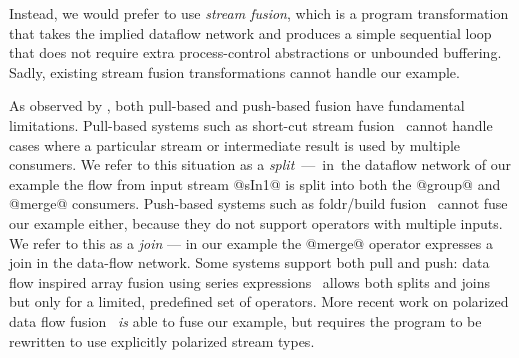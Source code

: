 
Instead, we would prefer to use \emph{stream fusion}, which is a program transformation that takes the implied dataflow network and produces a simple sequential loop that does not require extra process-control abstractions or unbounded buffering. Sadly, existing stream fusion transformations cannot handle our example. 

As observed by \citet{kay2009you}, both pull-based and push-based fusion have fundamental limitations. Pull-based systems such as short-cut stream fusion~\cite{coutts2007stream} cannot handle cases where a particular stream or intermediate result is used by multiple consumers. We refer to this situation as a \mbox{\emph{split} --- in the} dataflow network of our example the flow from input stream @sIn1@ is split into both the @group@ and @merge@ consumers. Push-based systems such as foldr/build fusion~\cite{gill1993short} cannot fuse our example either, because they do not support operators with multiple inputs. We refer to this as a \emph{join} --- in our example the @merge@ operator expresses a join in the data-flow network. Some systems support both pull and push: data flow inspired array fusion using series expressions~\cite{lippmeier2013data} allows both splits and joins but only for a limited, predefined set of operators. More recent work on polarized data flow fusion~\cite{lippmeier2016polarized} \emph{is} able to fuse our example, but requires the program to be rewritten to use explicitly polarized stream types. 



